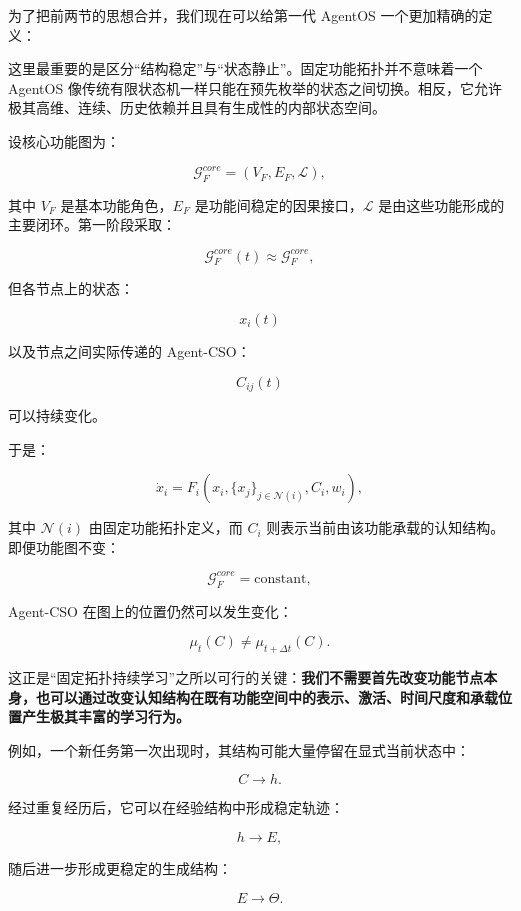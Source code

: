 为了把前两节的思想合并，我们现在可以给第一代 AgentOS 一个更加精确的定义：

\begin{statementbox}
\centering
{}
\end{statementbox}

这里最重要的是区分“结构稳定”与“状态静止”。固定功能拓扑并不意味着一个 AgentOS 像传统有限状态机一样只能在预先枚举的状态之间切换。相反，它允许极其高维、连续、历史依赖并且具有生成性的内部状态空间。

设核心功能图为：

\[
\mathcal{G}_{F}^{core}
=
(V_F,E_F,\mathcal{L}),
\]

其中 $V_F$ 是基本功能角色，$E_F$ 是功能间稳定的因果接口，$\mathcal{L}$ 是由这些功能形成的主要闭环。第一阶段采取：

\[
\mathcal{G}_{F}^{core}(t)
\approx
\mathcal{G}_{F}^{core},
\]

但各节点上的状态：

\[
x_i(t)
\]

以及节点之间实际传递的 Agent-CSO：

\[
C_{ij}(t)
\]

可以持续变化。

于是：

\[
\dot{x}_i
=
F_i
\left(
x_i,
\{x_j\}_{j\in\mathcal{N}(i)},
C_i,
w_i
\right),
\]

其中 $\mathcal{N}(i)$ 由固定功能拓扑定义，而 $C_i$ 则表示当前由该功能承载的认知结构。即便功能图不变：

\[
\mathcal{G}_{F}^{core}=\text{constant},
\]

Agent-CSO 在图上的位置仍然可以发生变化：

\[
\mu_t(C)
\neq
\mu_{t+\Delta t}(C).
\]

这正是“固定拓扑持续学习”之所以可行的关键：\textbf{我们不需要首先改变功能节点本身，也可以通过改变认知结构在既有功能空间中的表示、激活、时间尺度和承载位置产生极其丰富的学习行为。}

例如，一个新任务第一次出现时，其结构可能大量停留在显式当前状态中：

\[
C
\rightarrow
h.
\]

经过重复经历后，它可以在经验结构中形成稳定轨迹：

\[
h
\rightarrow
E,
\]

随后进一步形成更稳定的生成结构：

\[
E
\rightarrow
\Theta.
\]


